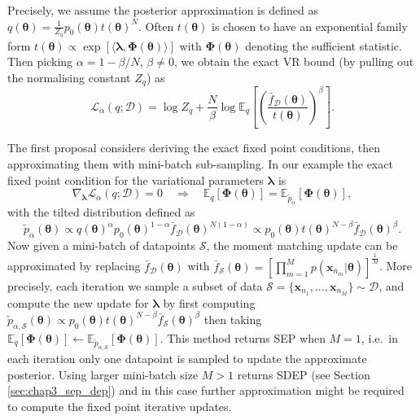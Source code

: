 Precisely, we assume the posterior approximation is defined as $q(\bm{\theta}) = \frac{1}{Z_q} p_0(\bm{\theta}) t(\bm{\theta})^N$.
Often $t(\bm{\theta})$ is chosen to have an exponential family form $t(\bm{\theta}) \propto \exp \left[ \langle \bm{\lambda}, \bm{\Phi}(\bm{\theta}) \rangle \right]$ with $\bm{\Phi}(\bm{\theta})$ denoting the sufficient statistic. Then picking $\alpha = 1 - \beta/N$, $\beta \neq 0$, we obtain the exact VR bound (by pulling out the normalising constant $Z_q$) as
\begin{equation}
\mathcal{L}_{\alpha}(q; \mathcal{D}) = \log Z_q + \frac{N}{\beta} \log \mathbb{E}_{q} \left[ \left( \frac{ \bar{f}_{\mathcal{D}}(\bm{\theta})} {t(\bm{\theta})} \right)^{\beta} \right].
\label{eq:vr_bound_sa_exact}
\end{equation}

The first proposal considers deriving the exact fixed point conditions, then approximating them with mini-batch sub-sampling. In our example the exact fixed point condition for the variational parameters $\bm{\lambda}$ is
\begin{equation}
\nabla_{\bm{\lambda}} \mathcal{L}_{\alpha}(q; \mathcal{D}) = 0 \quad \Rightarrow \quad \mathbb{E}_{q}[\bm{\Phi}(\bm{\theta})] = \mathbb{E}_{\tilde{p}_{\alpha}}[\bm{\Phi}(\bm{\theta})],
\end{equation} 
with the tilted distribution defined as 
$$\tilde{p}_{\alpha}(\bm{\theta}) \propto q(\bm{\theta})^{\alpha}p_0(\bm{\theta})^{1 - \alpha} \bar{f}_{\mathcal{D}}(\bm{\theta})^{N(1 - \alpha)} \propto p_0(\bm{\theta}) t(\bm{\theta})^{N - \beta} \bar{f}_{\mathcal{D}}(\bm{\theta})^{\beta}.$$ 
Now given a mini-batch of datapoints $\mathcal{S}$, the moment matching update can be approximated by replacing $\bar{f}_{\mathcal{D}}(\bm{\theta})$ with $\bar{f}_{\mathcal{S}}(\bm{\theta}) = [\prod_{m=1}^M p(\bm{x}_{n_m}|\bm{\theta})]^{\frac{1}{M}}$. More precisely, each iteration we sample a subset of data $\mathcal{S} = \{\bm{x}_{n_1}, ..., \bm{x}_{n_M} \} \sim \mathcal{D}$, and compute the new update for $\bm{\lambda}$ by first computing $\tilde{p}_{\alpha, \mathcal{S}}(\bm{\theta}) \propto p_0(\bm{\theta}) t(\bm{\theta})^{N - \beta} \bar{f}_{\mathcal{S}}(\bm{\theta})^{\beta}$ then taking $\mathbb{E}_{q}[\bm{\Phi}(\bm{\theta})] \leftarrow \mathbb{E}_{\tilde{p}_{\alpha, \mathcal{S}}}[\bm{\Phi}(\bm{\theta})]$. This method returns SEP when $M = 1$, i.e.~in each iteration only one datapoint is sampled to update the approximate posterior. Using larger mini-batch size $M > 1$ returns SDEP (see Section \ref{sec:chap3_sep_dep}) and in this case further approximation might be required to compute the fixed point iterative updates.

